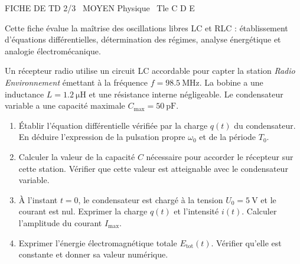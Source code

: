 \documentclass[11pt]{article}
\begin{document}
\pagestyle{empty}

\begin{tcolorbox}[enhanced,colback=popink,colframe=popink,arc=10pt,boxrule=0pt,left=12pt,right=12pt,top=9pt,bottom=9pt]
{\color{white}\popxbold\small FICHE DE TD 2/3 \textbullet\ MOYEN \hfill Physique \textbullet\ Tle C D E\par}
\end{tcolorbox}
\vspace{4pt}
Cette fiche évalue la maîtrise des oscillations libres LC et RLC : établissement d'équations différentielles, détermination des régimes, analyse énergétique et analogie électromécanique.

\begin{exercice}
Un récepteur radio utilise un circuit LC accordable pour capter la station \textit{Radio Environnement} émettant à la fréquence $f = \SI{98.5}{\mega\hertz}$. La bobine a une inductance $L = \SI{1.2}{\micro\henry}$ et une résistance interne négligeable. Le condensateur variable a une capacité maximale $C_{\text{max}} = \SI{50}{\pico\farad}$.
\begin{enumerate}
    \item Établir l'équation différentielle vérifiée par la charge $q(t)$ du condensateur. En déduire l'expression de la pulsation propre $\omega_0$ et de la période $T_0$.
    \item Calculer la valeur de la capacité $C$ nécessaire pour accorder le récepteur sur cette station. Vérifier que cette valeur est atteignable avec le condensateur variable.
    \item À l'instant $t=0$, le condensateur est chargé à la tension $U_0 = \SI{5}{\volt}$ et le courant est nul. Exprimer la charge $q(t)$ et l'intensité $i(t)$. Calculer l'amplitude du courant $I_{\text{max}}$.
    \item Exprimer l'énergie électromagnétique totale $E_{\text{tot}}(t)$. Vérifier qu'elle est constante et donner sa valeur numérique.
\end{enumerate}
\end{exercice}
\end{document}
